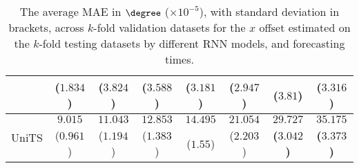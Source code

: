 \begin{table}[!ht]
{\begin{tabular}{|c|c|c|c|c|c|c|c|}
			 & ($1.834$) & ($3.824$) & ($3.588$) & ($3.181$) & ($2.947$) & ($3.81$) & ($3.316$) \\ \hline
			\multirow{2}{*}{UniTS} & $9.015$ & $11.043$ & $12.853$ & $14.495$ & $21.054$ & $\mathbf{29.727}$ & $\mathbf{35.175}$ \\
			 & ($0.961$) & ($1.194$) & ($1.383$) & ($1.55$) & ($2.203$) & \textbf{(}$\mathbf{3.042}$\textbf{)} & \textbf{(}$\mathbf{3.373}$\textbf{)} \\ \hline
		\end{tabular}
	}
	\caption{The average MAE in $\degree$ ($\times 10^{-5}$), with standard deviation in brackets, across $k$-fold validation datasets for the $x$ offset estimated on the $k$-fold testing datasets by different RNN models, and forecasting times.}
	\label{tab:mann_whitney_longitude_no_abs_MAE}
\end{table}

